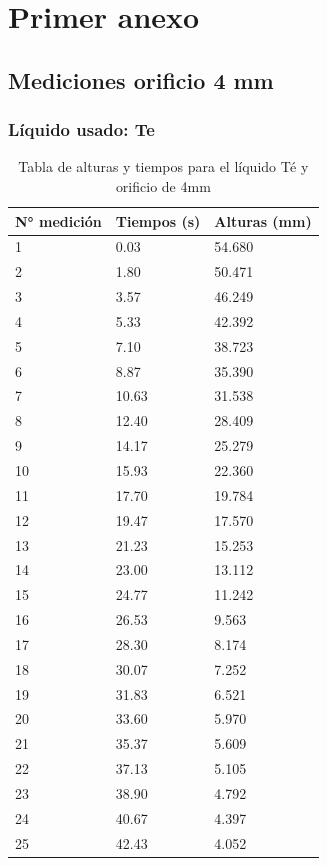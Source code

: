 \documentclass{article}
\begin{document}
\newpage
\section{Primer anexo}
\subsection{Mediciones orificio 4 mm}

\subsubsection{Líquido usado: Te}
\begin{table}[H]
    \begin{center}
        \begin{tabular}{ | m{2cm} | m{2cm} | m{2cm} | }
            \hline N° medición & Tiempos (s) & Alturas (mm) \\ 
            \hline 1 & 0.03 & 54.680 \\
            \hline 2 & 1.80 & 50.471 \\
            \hline 3 & 3.57 & 46.249 \\
            \hline 4 & 5.33 & 42.392 \\
            \hline 5 & 7.10 & 38.723 \\
            \hline 6 & 8.87 & 35.390 \\
            \hline 7 & 10.63 & 31.538 \\
            \hline 8 & 12.40 & 28.409 \\
            \hline 9 & 14.17 & 25.279 \\
            \hline 10 & 15.93 & 22.360 \\
            \hline 11 & 17.70 & 19.784 \\
            \hline 12 & 19.47 & 17.570 \\
            \hline 13 & 21.23 & 15.253 \\
            \hline 14 & 23.00 & 13.112 \\
            \hline 15 & 24.77 & 11.242 \\
            \hline 16 & 26.53 & 9.563 \\
            \hline 17 & 28.30 & 8.174 \\
            \hline 18 & 30.07 & 7.252 \\
            \hline 19 & 31.83 & 6.521 \\
            \hline 20 & 33.60 & 5.970 \\
            \hline 21 & 35.37 & 5.609 \\
            \hline 22 & 37.13 & 5.105 \\
            \hline 23 & 38.90 & 4.792 \\
            \hline 24 & 40.67 & 4.397 \\
            \hline 25 & 42.43 & 4.052 \\
            \hline
        \end{tabular}
    \end{center}
    \caption{Tabla de alturas y tiempos para el líquido Té y orificio de 4mm}
\end{table}
\end{document}
